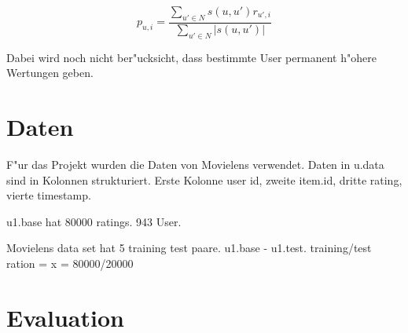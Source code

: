\documentclass[a4paper, 11pt]{article}
\begin{document}
\begin{equation}
  \label{eq:computeprediction}
  p_{u,i} = \frac{\sum_{u' \in N}{s(u,u') r_{u',i}}}{\sum_{u' \in N}{|s(u,u')|}}
\end{equation}

Dabei wird noch nicht ber"ucksicht, dass bestimmte User permanent h"ohere Wertungen geben.

\section{Daten}
\label{sec:data}

F"ur das Projekt wurden die Daten von Movielens verwendet. Daten in u.data sind in Kolonnen strukturiert. Erste Kolonne user id, zweite item.id, dritte rating, vierte timestamp. 

u1.base hat 80000 ratings. 943 User.

Movielens data set hat 5 training test paare. u1.base - u1.test. 
training/test ration = x = 80000/20000


\section{Evaluation}
\label{sec:evaluation}
\end{document}
